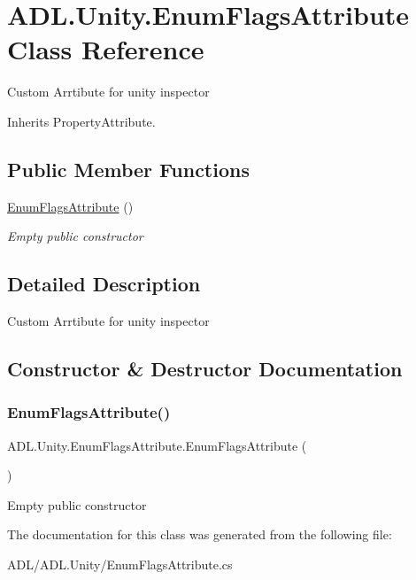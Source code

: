\hypertarget{class_a_d_l_1_1_unity_1_1_enum_flags_attribute}{}\section{A\+D\+L.\+Unity.\+Enum\+Flags\+Attribute Class Reference}
\label{class_a_d_l_1_1_unity_1_1_enum_flags_attribute}


Custom Arrtibute for unity inspector  




Inherits Property\+Attribute.

\subsection*{Public Member Functions}
\begin{DoxyCompactItemize}
\item 
\mbox{\hyperlink{class_a_d_l_1_1_unity_1_1_enum_flags_attribute_a2d39c9f0f7265dab266e792e32766970}{Enum\+Flags\+Attribute}} ()
\begin{DoxyCompactList}\small\item\em Empty public constructor \end{DoxyCompactList}\end{DoxyCompactItemize}


\subsection{Detailed Description}
Custom Arrtibute for unity inspector 



\subsection{Constructor \& Destructor Documentation}
\mbox{\label{class_a_d_l_1_1_unity_1_1_enum_flags_attribute_a2d39c9f0f7265dab266e792e32766970}} 
\subsubsection{\texorpdfstring{Enum\+Flags\+Attribute()}{EnumFlagsAttribute()}}
{\footnotesize\ttfamily A\+D\+L.\+Unity.\+Enum\+Flags\+Attribute.\+Enum\+Flags\+Attribute (\begin{DoxyParamCaption}{ }\end{DoxyParamCaption})}



Empty public constructor 



The documentation for this class was generated from the following file\+:\begin{DoxyCompactItemize}
\item 
A\+D\+L/\+A\+D\+L.\+Unity/Enum\+Flags\+Attribute.\+cs\end{DoxyCompactItemize}
